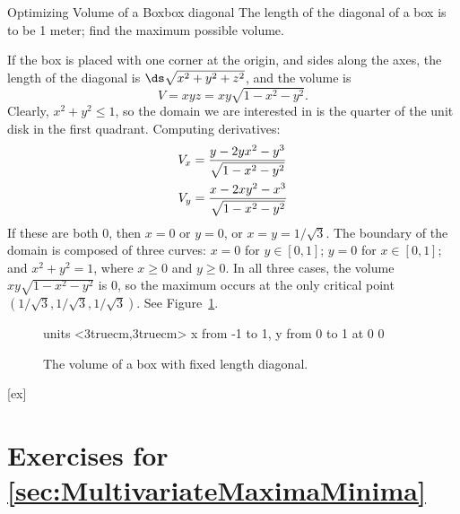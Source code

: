 \begin{example}{Optimizing Volume of a Box}{box diagonal}
The length of the diagonal of a box is to be 1 meter; find the
maximum possible volume.
\end{example}
\begin{solution}
If the box is placed with one corner at the origin, and sides along
the axes, the length of the diagonal is $\ds\sqrt{x^2+y^2+z^2}$, and
the volume is
$$V=xyz=xy\sqrt{1-x^2-y^2}.$$
Clearly, $x^2+y^2\le 1$, so the domain we are interested in
is the quarter of the unit disk in the first quadrant.
Computing derivatives:
\begin{align*}
V_x&={y-2yx^2-y^3\over\sqrt{1-x^2-y^2}}	\\
V_y&={x-2xy^2-x^3\over\sqrt{1-x^2-y^2}}	\\
\end{align*}
If these are both 0, then $x=0$ or $y=0$, or $x=y=1/\sqrt3$. The boundary of
the domain is composed of three curves: $x=0$ for $y\in[0,1]$; $y=0$
for $x\in[0,1]$; and $x^2+y^2=1$, where $x\ge0$ and $y\ge0$. In all
three cases, the volume  $xy\sqrt{1-x^2-y^2}$ is 0, so the maximum
occurs at the only critical point $(1/\sqrt3,1/\sqrt3,1/\sqrt3)$. See
Figure~\ref{fig:max volume}.
\end{solution}

\begin{figure}[H]
\centerline{
\vbox{\beginpicture
\normalgraphs
\setcoordinatesystem units <3truecm,3truecm>
\setplotarea x from -1 to 1, y from 0 to 1
 at 0 0
\endpicture}}
\caption{The volume of a box with fixed length diagonal.}
\label{fig:max volume}
\end{figure}


[ex]
\section*{Exercises for \ref{sec:MultivariateMaximaMinima}}

